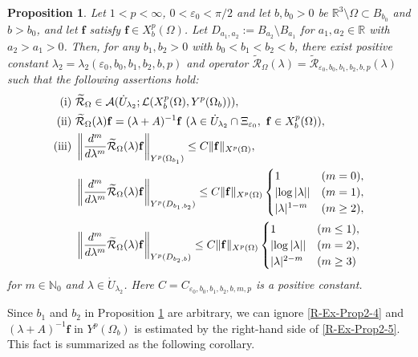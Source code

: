 \documentclass[dvipdfmx,12pt]{article}
\newtheorem{prop}[dfn]{Proposition}
\begin{document}
\begin{prop}\label{R-Ex-Prop2}
Let $1<p<\infty$, $0<\varepsilon_0<\pi/2$ and let $b, b_0>0$ be $\mathbb{R}^3 \setminus \Omega \subset B_{b_0}$ and $b>b_0$, and let $\mathbf{f}$ satisfy $\mathbf{f}\in X_b^p(\Omega)$. Let $D_{a_1,a_2}:=B_{a_2}\setminus B_{a_1}$ for $a_1,a_2\in \mathbb{R}$ with $a_2>a_1>0$.
Then, for any $b_1,b_2>0$ with $b_0<b_1<b_2<b$, there exist positive constant $\lambda_2=\lambda_2(\varepsilon_0,b_0,b_1,b_2,b,p)$ and operator $\widetilde{\mathcal{R}}_\Omega (\lambda)=\widetilde{\mathcal{R}}_{\varepsilon_0,b_0,b_1,b_2,b,p} (\lambda)$ such that the following assertions hold:
\begin{align}
{\rm (i)}~ &\widetilde{\mathcal{R}}_\Omega\in\mathcal{A}(\Dot{U}_{\lambda_2}; \mathcal{L}(X_b^p(\Omega),Y^p(\Omega_b))), \label{R-Ex-Prop2-1} \\
{\rm (ii)}~ &\widetilde{\mathcal{R}}_\Omega(\lambda)\mathbf{f}=(\lambda+A)^{-1}\mathbf{f}~(\lambda\in \Dot{U}_{\lambda_2}\cap \Xi_{\varepsilon_0},~\mathbf{f}\in X_b^p(\Omega) ), \label{R-Ex-Prop2-2} \\
{\rm (iii)}~
&\left\| \frac{d^m}{d\lambda^m}\widetilde{\mathcal{R}}_\Omega (\lambda)\mathbf{f}\right\|_{Y^p(\Omega_{b_1})} 
\le C\|\mathbf{f}\|_{X^p(\Omega)},
\label{R-Ex-Prop2-3} \\
&\left\| \frac{d^m}{d\lambda^m}\widetilde{\mathcal{R}}_\Omega (\lambda)\mathbf{f}\right\|_{Y^p( D_{b_1,b_2})} 
\le C\|\mathbf{f}\|_{X^p(\Omega)}
\begin{cases}
1 & (m=0), \\
\left|\log |\lambda|\right| & (m=1), \\
|\lambda|^{1-m} &(m\ge2),
\end{cases}  \label{R-Ex-Prop2-4} \\
&\left\| \frac{d^m}{d\lambda^m}\widetilde{\mathcal{R}}_\Omega (\lambda)\mathbf{f}\right\|_{Y^p(D_{b_2,b})} 
\le C\|\mathbf{f}\|_{X^p(\Omega)}
\begin{cases}
1 & (m\le1), \\
\left|\log |\lambda|\right| & (m=2), \\
|\lambda|^{2-m} &(m\ge3)
\end{cases}  \label{R-Ex-Prop2-5}
\end{align}
for $m\in\mathbb{N}_0$ and $\lambda\in \Dot{U}_{\lambda_2}$. 
Here $C=C_{\varepsilon_0,b_0,b_1,b_2,b,m,p}$ is a positive constant. 
\end{prop}

Since $b_1$ and $b_2$ in Proposition \ref{R-Ex-Prop2} are arbitrary, we can ignore \eqref{R-Ex-Prop2-4} and $(\lambda+A)^{-1}\mathbf{f}$ in $Y^p(\Omega_b)$ is estimated by the right-hand side of \eqref{R-Ex-Prop2-5}. This fact is summarized as the following corollary. 
\end{document}
